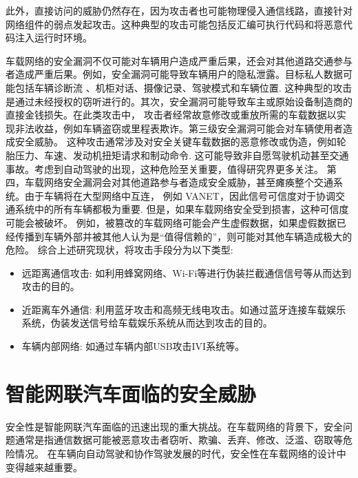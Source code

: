 此外，直接访问的威胁仍然存在，因为攻击者也可能物理侵入通信线路，直接针对网络组件的弱点发起攻击。这种典型的攻击可能包括反汇编可执行代码和将恶意代码注入运行时环境。

车载网络的安全漏洞不仅可能对车辆用户造成严重后果，还会对其他道路交通参与者造成严重后果。例如，安全漏洞可能导致车辆用户的隐私泄露。目标私人数据可能包括车辆诊断流
、机柜对话、摄像记录、驾驶模式和车辆位置\cite{amoozadeh2015security}. 
这种典型的攻击是通过未经授权的窃听进行的。其次，安全漏洞可能导致车主或原始设备制造商的直接金钱损失。在此类攻击中，
攻击者经常故意修改或重放所需的车载数据以实现非法收益，例如车辆盗窃或里程表欺诈。第三级安全漏洞可能会对车辆使用者造成安全威胁。
这种攻击通常涉及对安全关键车载数据的恶意修改或伪造，例如轮胎压力、车速、发动机扭矩请求和制动命令. 
这可能导致非自愿驾驶机动甚至交通事故。考虑到自动驾驶的出现，这种危险至关重要，值得研究界更多关注。
第四，车载网络安全漏洞会对其他道路参与者造成安全威胁，甚至瘫痪整个交通系统。由于车辆将在大型网络中互连，
例如 VANET，因此信号可信度对于协调交通系统中的所有车辆都极为重要\cite{harding2014vehicle}.
 但是，如果车载网络安全受到损害，这种可信度可能会被破坏。
 例如，被篡改的车载网络可能会产生虚假数据，如果虚假数据已经传播到车辆外部并被其他人认为是“值得信赖的”，则可能对其他车辆造成极大的危险。
综合上述研究现状，将攻击手段分为以下类型:
\begin{itemize}
    \item 远距离通信攻击: 如利用蜂窝网络、Wi-Fi等进行伪装拦截通信信号等从而达到攻击的目的。
    \item 近距离车外通信: 利用蓝牙攻击和高频无线电攻击。如通过蓝牙连接车载娱乐系统，伪装发送信号给车载娱乐系统从而达到攻击的目的。
    \item 车辆内部网络: 如通过车辆内部USB攻击IVI系统等。
\end{itemize}

\section{智能网联汽车面临的安全威胁}
安全性是智能网联汽车面临的迅速出现的重大挑战。在车载网络的背景下，安全问题通常是指通信数据可能被恶意攻击者窃听、欺骗、丢弃、修改、泛滥、窃取等危险情况。
在车辆向自动驾驶和协作驾驶发展的时代，安全性在车载网络的设计中变得越来越重要。


